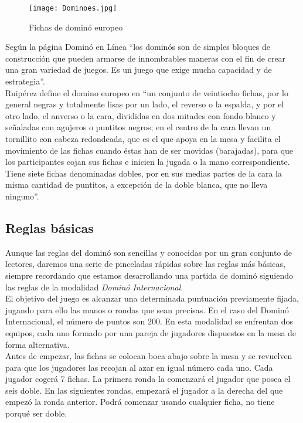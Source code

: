 \begin{figure}[h]
  \label{Dominoes}
  \begin{center}
    \texttt{[image: Dominoes.jpg]}
  \end{center}
  \caption{Fichas de dominó europeo}
\end{figure}

Según la página Dominó en Línea \cite{website:dominoenlinea} “los dominós son de simples bloques de construcción
que pueden armarse de innombrables maneras con el fin de crear una gran variedad de juegos. Es un
juego que exige mucha capacidad y de estrategia”. \\

Ruipérez define el domino europeo en “un conjunto de veintiocho fichas, por lo general negras y
totalmente lisas por un lado, el reverso o la espalda, y por el otro lado, el anverso o la cara,
divididas en dos mitades con fondo blanco y señaladas con agujeros o puntitos negros; en el centro
de la cara llevan un tornillito con cabeza redondeada, que es el que apoya en la mesa y facilita
el movimiento de las fichas cuando éstas han de ser movidas (barajadas), para que los participantes
cojan sus fichas e inicien la jugada o la mano correspondiente. Tiene siete fichas denominadas
dobles, por en sus medias partes de la cara la misma cantidad de puntitos, a excepción de la
doble blanca, que no lleva ninguno”. \\

\subsection{Reglas básicas}

Aunque las reglas del dominó son sencillas y conocidas por un gran conjunto de lectores, daremos una
serie de pinceladas rápidas sobre las reglas más básicas, siempre recordando que estamos desarrollando
una partida de dominó siguiendo las reglas de la modalidad \emph{Dominó Internacional}. \\

El objetivo del juego es alcanzar una determinada puntuación previamente fijada, jugando para ello las
manos o rondas que sean precisas. En el caso del Dominó Internacional, el número de puntos son 200. En esta modalidad se enfrentan dos equipos, cada uno formado por una pareja de jugadores dispuestos en la mesa de forma alternativa. \\

Antes de empezar, las fichas se colocan boca abajo sobre la mesa y se revuelven para que los jugadores
las recojan al azar en igual número cada uno. Cada jugador cogerá 7 fichas. La primera ronda la comenzará
el jugador que posea el seis doble. En las siguientes rondas, empezará el jugador a la derecha del que
empezó la ronda anterior. Podrá comenzar usando cualquier ficha, no tiene porqué ser doble. \\

